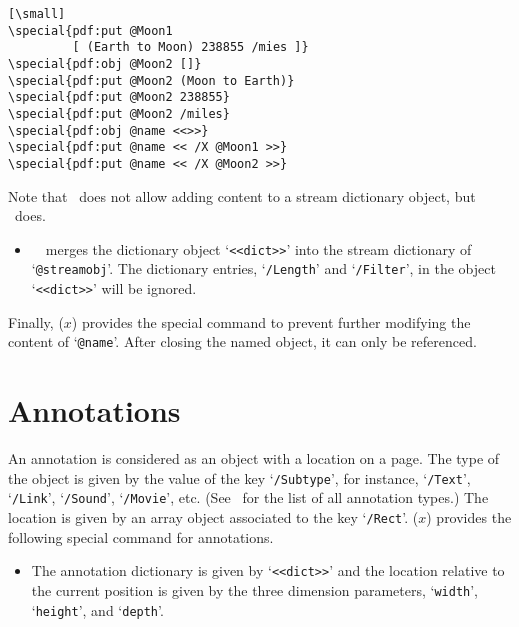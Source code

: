 \documentclass[final]{ltugboat}
\def\DPM{\acro{DVI\-PDFM}}
\def\DPMx{\acro{DVI\-PDFM}($x$)}
\let\DPX\DVIPDFMx
\def\fafter{1.5pt}
\begin{document}
\begin{verbatim}[\small]
\special{pdf:put @Moon1
         [ (Earth to Moon) 238855 /mies ]}
\special{pdf:obj @Moon2 []}
\special{pdf:put @Moon2 (Moon to Earth)}
\special{pdf:put @Moon2 238855}
\special{pdf:put @Moon2 /miles}
\special{pdf:obj @name <<>>}
\special{pdf:put @name << /X @Moon1 >>}
\special{pdf:put @name << /X @Moon2 >>}
\end{verbatim}

Note that \DPM\ does not allow adding content to a stream dictionary object, but \DPX\ does.

\begin{itemize}
\item{} \ \ merges the dictionary object `\texttt{<<dict>>}' into the stream dictionary of `\texttt{@streamobj}'. The dictionary entries, `\texttt{/Length}' and `\texttt{/Filter}', in the object `\texttt{<<dict>>}' will be ignored.
\end{itemize}

Finally, \DPMx{} provides the special command
 to prevent further modifying the content of `\texttt{@name}'. After closing the named object, it can only be referenced.


\section{Annotations}

An annotation is considered as an object with a location on a page.
The type of the object is given by the value of the key `\texttt{/Subtype}', for instance, `\texttt{/Text}', `\texttt{/Link}', `\texttt{/Sound}', `\texttt{/Movie}', etc.
(See~\cite[p.~615]{PDFReference} for the list of all annotation types.)
The location is given by an array object associated to the key `\texttt{/Rect}'.
\DPMx{} provides the following special command for annotations.

\begin{itemize}
\item{}
\par\vspace{\fafter}\noindent
The annotation dictionary is given by `\texttt{<<dict>>}' and the location relative to the current position is given by the three dimension parameters, `\texttt{width}', `\texttt{height}', and `\texttt{depth}'.
\end{itemize}
\end{document}
